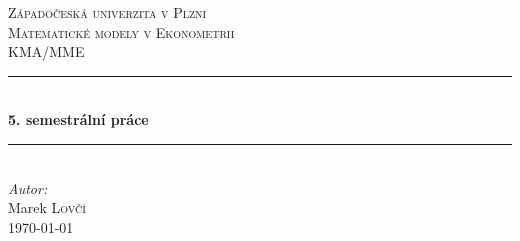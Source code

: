 	
\linespread{1}

\begin{titlepage}
	
	\newcommand{\HRule}{\rule{\linewidth}{0.5mm}} %
	
	\center{} %
	 
	
	\textsc{\LARGE Západočeská univerzita v Plzni}\\[1.5cm] %
	\textsc{\Large Matematické modely v Ekonometrii}\\[0.5cm] %
	\textsc{\large KMA/MME}\\[0.5cm] %
	
	
	\HRule{} \\[0.4cm]
	{\huge \bfseries 5. semestrální práce}\\ %
	\HRule{} \\[1.5cm]
	 
	
	\Large \emph{Autor:}\\
	Marek \textsc{Lovčí}\\[3.3cm]
	
	
	{\large \today}\\[2cm] %
	
	

\end{titlepage}
